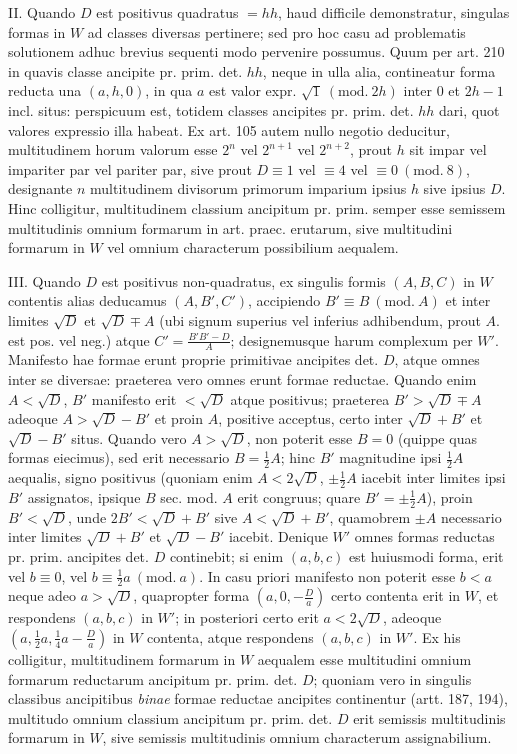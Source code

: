 II. Quando $D$ est positivus quadratus $=hh$, haud difficile demonstratur,
singulas formas in $W$ ad classes diversas pertinere; sed pro hoc casu ad problematis
solutionem adhuc brevius sequenti modo pervenire possumus. Quum per
art. 210 in quavis classe ancipite pr. prim. det. $hh$, neque in ulla alia, contineatur
forma reducta una $(a,h,0)$, in qua $a$ est valor expr. $\sqrt{1}\ (\mathrm{mod.}\ 2h)$ inter $0$ et
$2h-1$ incl. situs: perspicuum est, totidem classes ancipites pr. prim. det. $hh$
dari, quot valores expressio illa habeat. Ex art. 105 autem nullo negotio deducitur,
multitudinem horum valorum esse $2^n$ vel $2^{n+1}$ vel $2^{n+2}$, prout $h$ sit
impar vel impariter par vel pariter par, sive prout $D\equiv1$ vel $\equiv4$ vel $\equiv0\ (\mathrm{mod.}\ 8)$,
designante $n$ multitudinem divisorum primorum imparium ipsius $h$ sive ipsius $D$.
Hinc colligitur, multitudinem classium ancipitum pr. prim. semper esse semissem
multitudinis omnium formarum in art. praec. erutarum, sive multitudini formarum
in $W$ vel omnium characterum possibilium aequalem.

III. Quando $D$ est positivus non-quadratus, ex singulis formis $(A,B,C)$
in $W$ contentis alias deducamus $(A,B',C')$, accipiendo $B'\equiv B\ (\mathrm{mod.}\ A)$ et inter
limites $\sqrt{D}$ et $\sqrt{D}\mp A$ (ubi signum superius vel inferius adhibendum, prout $A$.
est pos. vel neg.) atque $C'=\frac{B'B'-D}{A}$; designemusque harum complexum per $W'$.
Manifesto hae formae erunt proprie primitivae ancipites det. $D$, atque omnes
inter se diversae: praeterea vero omnes erunt formae reductae. Quando enim
$A<\sqrt{D}$, $B'$ manifesto erit $<\sqrt{D}$ atque positivus; praeterea $B'>\sqrt{D}\mp A$
adeoque $A>\sqrt{D}-B'$ et proin $A$, positive acceptus, certo inter $\sqrt{D}+B'$ et
$\sqrt{D}-B'$ situs. Quando vero $A>\sqrt{D}$, non poterit esse $B=0$ (quippe quas
formas eiecimus), sed erit necessario $B=\frac12 A$; hinc $B'$ magnitudine ipsi $\frac12 A$
aequalis, signo positivus (quoniam enim $A<2\sqrt{D}$, $\pm\frac12 A$ iacebit inter limites
ipsi $B'$ assignatos, ipsique $B$ sec. mod. $A$ erit congruus; quare $B'=\pm\frac12 A$),
proin $B'<\sqrt{D}$, unde $2B'<\sqrt{D}+B'$ sive $A<\sqrt{D}+B'$, quamobrem $\pm A$
necessario inter limites $\sqrt{D}+B'$ et $\sqrt{D}-B'$ iacebit. Denique $W'$ omnes formas
reductas pr. prim. ancipites det. $D$ continebit; si enim $(a,b,c)$ est huiusmodi
forma, erit vel $b\equiv0$, vel $b\equiv\frac12 a\ (\mathrm{mod.}\ a)$. In casu priori manifesto non poterit
esse $b<a$ neque adeo $a>\sqrt{D}$, quapropter forma $\left(a,0,-\frac{D}{a}\right)$ certo contenta
erit in $W$, et respondens $(a,b,c)$ in $W'$; in posteriori certo erit $a<2\sqrt{D}$,
adeoque $\left(a,\allowbreak \frac12 a,\allowbreak \frac14 a-\frac{D}{a}\right)$ in $W$ contenta, atque respondens $(a,b,c)$ in $W'$.
Ex his colligitur, multitudinem formarum in $W$ aequalem esse multitudini
omnium formarum reductarum ancipitum pr. prim. det. $D$; quoniam vero in singulis
classibus ancipitibus \textit{binae} formae reductae ancipites continentur (artt. 187,
194), multitudo omnium classium ancipitum pr. prim. det. $D$ erit semissis multitudinis
formarum in $W$, sive semissis multitudinis omnium characterum assignabilium.

